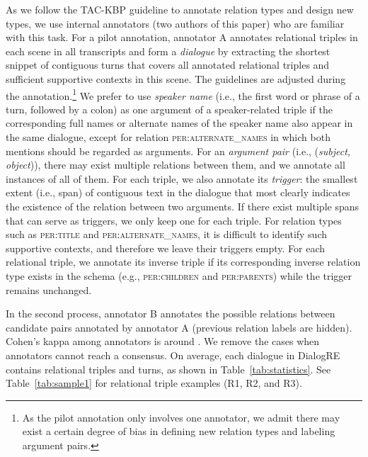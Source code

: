 \documentclass[11pt,a4paper]{article}
\newcommand{\eg}{{e.g.}}
\newcommand{\ie}{{i.e.}}
\begin{document}
As we follow the TAC-KBP guideline to annotate relation types and design new types, we use internal annotators (two authors of this paper) who are familiar with this task. For a pilot annotation, annotator A annotates relational triples in each scene in all transcripts and form a \emph{dialogue} by extracting the shortest snippet of contiguous turns that covers all annotated relational triples and sufficient supportive contexts in this scene. The guidelines are adjusted during the annotation.\footnote{As the pilot annotation only involves one annotator, we admit there may exist a certain degree of bias in defining new relation types and labeling argument pairs.} We prefer to use \emph{speaker name} (\ie, the first word or phrase of a turn, followed by a colon) as one argument of a speaker-related triple if the corresponding full names or alternate names of the speaker name also appear in the same dialogue, except for relation \textsc{per:alternate\_names} in which both mentions should be regarded as arguments. For an \emph{argument pair} (\ie, (\emph{subject, object})), there may exist multiple relations between them, and we annotate all instances of all of them. For each triple, we also annotate its \emph{trigger}: the smallest extent (\ie, span) of contiguous text in the dialogue that most clearly indicates the existence of the relation between two arguments. If there exist multiple spans that can serve as triggers, we only keep one for each triple. For relation types such as \textsc{per:title} and \textsc{per:alternate\_names}, it is difficult to identify such supportive contexts, and therefore we leave their triggers empty. For each relational triple, we annotate its inverse triple if its corresponding inverse relation type exists in the schema (\eg, \textsc{per:children} and \textsc{per:parents}) while the trigger remains unchanged.  


In the second process, annotator B annotates the possible relations between candidate pairs annotated by annotator A (previous relation labels are hidden). Cohen's kappa among annotators is around . We remove the cases when annotators cannot reach a consensus. On average, each dialogue in DialogRE contains  relational triples and  turns, as shown in Table~\ref{tab:statistics}. See Table~\ref{tab:sample1} for relational triple examples (R1, R2, and R3).
\end{document}
